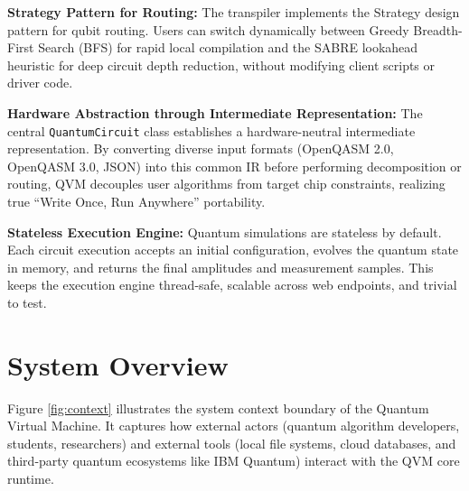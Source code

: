 \textbf{Strategy Pattern for Routing:} The transpiler implements the Strategy design pattern for qubit routing. Users can switch dynamically between Greedy Breadth-First Search (BFS) for rapid local compilation and the SABRE lookahead heuristic \cite{li2019sabre} for deep circuit depth reduction, without modifying client scripts or driver code.

\textbf{Hardware Abstraction through Intermediate Representation:} The central \texttt{QuantumCircuit} class establishes a hardware-neutral intermediate representation. By converting diverse input formats (OpenQASM 2.0, OpenQASM 3.0, JSON) into this common IR before performing decomposition or routing, QVM decouples user algorithms from target chip constraints, realizing true ``Write Once, Run Anywhere'' portability.

\textbf{Stateless Execution Engine:} Quantum simulations are stateless by default. Each circuit execution accepts an initial configuration, evolves the quantum state in memory, and returns the final amplitudes and measurement samples. This keeps the execution engine thread-safe, scalable across web endpoints, and trivial to test.

\section{System Overview}
Figure \ref{fig:context} illustrates the system context boundary of the Quantum Virtual Machine. It captures how external actors (quantum algorithm developers, students, researchers) and external tools (local file systems, cloud databases, and third-party quantum ecosystems like IBM Quantum) interact with the QVM core runtime.

